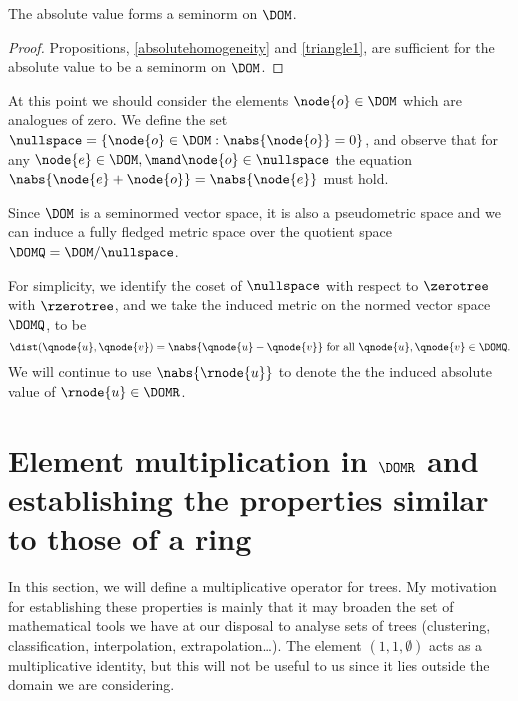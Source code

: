 \begin{corollary}\label{gseminorm}
  The absolute value forms a seminorm on $\DOM$.
  \begin{proof}  
    Propositions, \ref{absolutehomogeneity} and \ref{triangle1}, are 
    sufficient for the absolute value to be a seminorm on
    $\DOM$.
  \end{proof}
\end{corollary}

At this point we should consider the elements
$\node{o} \in \DOM$
which are analogues of zero. We define the set
$\nullspace =\{\node{o}\in\DOM: \nabs{\node{o}} = 0\}$,
and observe that for any
$\node{e} \in \DOM, \mand \node{o} \in \nullspace$
the equation
$\nabs{\node{e} + \node{o}} = \nabs{\node{e}}$
must hold. 

Since $\DOM$ is a seminormed vector space, it is also a pseudometric
space and we can induce a fully fledged metric space over the quotient
space $\DOMQ = \DOM / \nullspace$.

For simplicity, we identify the coset of $\nullspace$ with respect to
$\zerotree$ with $\rzerotree$, and we take the induced metric on the
normed vector space $\DOMQ$, to be
\[\dist(\qnode{u},\qnode{v}) =
\nabs{\qnode{u} - \qnode{v}} \text{ for all }\qnode{u}, \qnode{v} \in
\DOMQ.\]  We will continue to use \(\nabs{\rnode{u}}\) to denote the
the induced absolute value of \(\rnode{u}\in\DOMR\).




\section{Element multiplication in $\DOMR$ and establishing the
  properties similar to those of a ring}

In this section, we will define a multiplicative operator for
trees. My motivation for establishing these properties is mainly that
it may broaden the set of mathematical tools we have at our
disposal to analyse sets of trees (clustering, classification,
interpolation, extrapolation\ldots).  The element \((1,1,\emptyset)\)
acts as a multiplicative identity, but this will not be useful to us
since it lies outside the domain we are considering.

